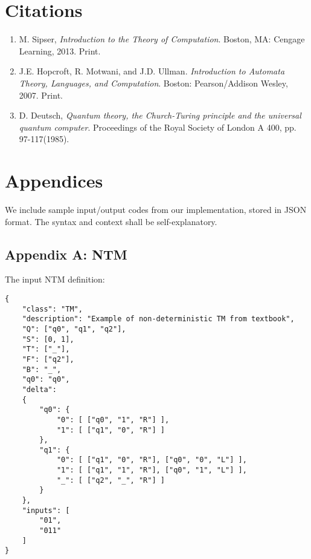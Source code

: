 \documentclass[12pt]{article}  %
\begin{document}
\section{Citations}

\begin{enumerate}
\item M. Sipser, \emph{Introduction to the Theory of Computation}. Boston, MA: Cengage Learning, 2013. Print.

\item J.E. Hopcroft, R. Motwani, and J.D. Ullman. \emph{Introduction to Automata Theory, Languages, and Computation}. Boston: Pearson/Addison Wesley, 2007. Print.

\item D. Deutsch, \emph{Quantum theory, the Church-Turing principle and the universal quantum computer}. Proceedings of the Royal Society of London A 400, pp. 97-117(1985). \label{quantum}
\end{enumerate}





\section{Appendices}
We include sample input/output codes from our implementation, stored in JSON format. The syntax and context shall be self-explanatory.

\subsection{Appendix A: NTM}

The input NTM definition:
\begin{verbatim}
{
    "class": "TM",
    "description": "Example of non-deterministic TM from textbook",
    "Q": ["q0", "q1", "q2"],
    "S": [0, 1],
    "T": ["_"],
    "F": ["q2"],
    "B": "_",
    "q0": "q0",
    "delta":
    {
        "q0": {
            "0": [ ["q0", "1", "R"] ],
            "1": [ ["q1", "0", "R"] ]
        },
        "q1": {
            "0": [ ["q1", "0", "R"], ["q0", "0", "L"] ],
            "1": [ ["q1", "1", "R"], ["q0", "1", "L"] ],
            "_": [ ["q2", "_", "R"] ]
        }
    },
    "inputs": [
        "01",
        "011"
    ]
}
\end{verbatim}
\end{document}
